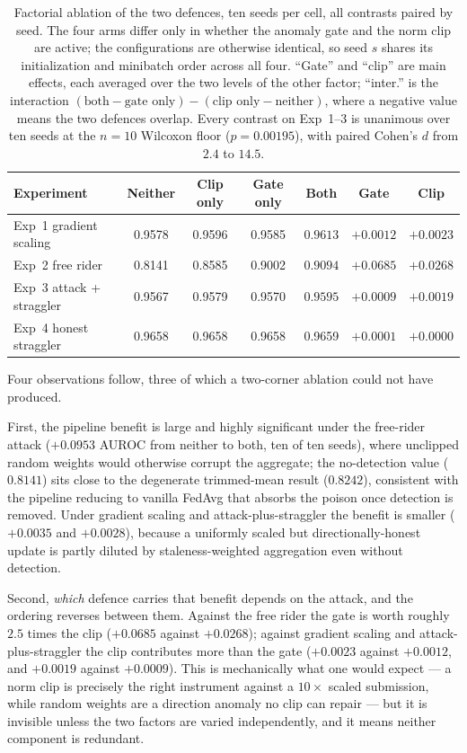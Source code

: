 \documentclass[pdflatex,sn-mathphys-num]{sn-jnl}
\begin{document}
\begin{table}[htbp]
\caption{Factorial ablation of the two defences, ten seeds per cell, all contrasts paired by seed. The four arms differ only in whether the anomaly gate and the norm clip are active; the configurations are otherwise identical, so seed $s$ shares its initialization and minibatch order across all four. ``Gate'' and ``clip'' are main effects, each averaged over the two levels of the other factor; ``inter.'' is the interaction $(\text{both}-\text{gate only})-(\text{clip only}-\text{neither})$, where a negative value means the two defences overlap. Every contrast on Exp~1--3 is unanimous over ten seeds at the $n=10$ Wilcoxon floor ($p=0.00195$), with paired Cohen's $d$ from $2.4$ to $14.5$.}
\label{tab:ablation}
\centering
\begin{tabular}{lcccccc}
\toprule
Experiment & Neither & Clip only & Gate only & Both & Gate & Clip \\
\midrule
Exp~1 gradient scaling & 0.9578 & 0.9596 & 0.9585 & $\mathbf{0.9613}$ & $+0.0012$ & $+0.0023$ \\
Exp~2 free rider & 0.8141 & 0.8585 & 0.9002 & $\mathbf{0.9094}$ & $+0.0685$ & $+0.0268$ \\
Exp~3 attack + straggler & 0.9567 & 0.9579 & 0.9570 & $\mathbf{0.9595}$ & $+0.0009$ & $+0.0019$ \\
Exp~4 honest straggler & 0.9658 & 0.9658 & 0.9658 & 0.9659 & $+0.0001$ & $+0.0000$ \\
\bottomrule
\end{tabular}
\end{table}

Four observations follow, three of which a two-corner ablation could not have produced.

First, the pipeline benefit is large and highly significant under the free-rider attack ($+0.0953$ AUROC from neither to both, ten of ten seeds), where unclipped random weights would otherwise corrupt the aggregate; the no-detection value ($0.8141$) sits close to the degenerate trimmed-mean result ($0.8242$), consistent with the pipeline reducing to vanilla FedAvg that absorbs the poison once detection is removed. Under gradient scaling and attack-plus-straggler the benefit is smaller ($+0.0035$ and $+0.0028$), because a uniformly scaled but directionally-honest update is partly diluted by staleness-weighted aggregation even without detection.

Second, \emph{which} defence carries that benefit depends on the attack, and the ordering reverses between them. Against the free rider the gate is worth roughly $2.5$ times the clip ($+0.0685$ against $+0.0268$); against gradient scaling and attack-plus-straggler the clip contributes more than the gate ($+0.0023$ against $+0.0012$, and $+0.0019$ against $+0.0009$). This is mechanically what one would expect --- a norm clip is precisely the right instrument against a $10\times$ scaled submission, while random weights are a direction anomaly no clip can repair --- but it is invisible unless the two factors are varied independently, and it means neither component is redundant.
\end{document}
